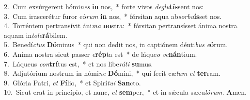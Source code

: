 {2.~}Cum exsúrgerent hómi\textit{nes} \textbf{in} nos,~* forte vivos \textit{de}\textit{glu}\textbf{tís}sent nos:\\
{3.~}Cum irascerétur furor eó\textit{rum} \textbf{in} nos,~* fórsitan aqua ab\textit{sor}\textit{bu}\textbf{ís}set nos.\\
{4.~}Torréntem pertransívit áni\textit{ma} \textbf{no}stra:~* fórsitan pertransísset ánima nostra aquam in\textit{to}\textit{le}\textbf{rá}bilem.\\
{5.~}Benedí\textit{ctus} \textbf{Dó}minus~* qui non dedit nos, in captiónem dénti\textit{bus} \textit{e}\textbf{ó}rum.\\
{6.~}Anima nostra sicut passer \textit{e}\textbf{rép}ta est~* de láque\textit{o} \textit{ve}\textbf{nán}tium.\\
{7.~}Láqueus \textit{con}\textbf{trí}tus est,~* et nos libe\textit{rá}\textit{ti} \textbf{su}mus.\\
{8.~}Adjutórium nostrum in nómi\textit{ne} \textbf{Dó}mini,~* qui fecit cæ\textit{lum} \textit{et} \textbf{ter}ram.\\
{9.~}Glória Patri, \textit{et} \textbf{Fí}lio,~* et Spirí\textit{tu}\textit{i} \textbf{San}cto.\\
{10.~}Sicut erat in princípio, et nunc, \textit{et} \textbf{sem}per,~* et in sǽcula sæcu\textit{ló}\textit{rum}. \textbf{A}men.\\
